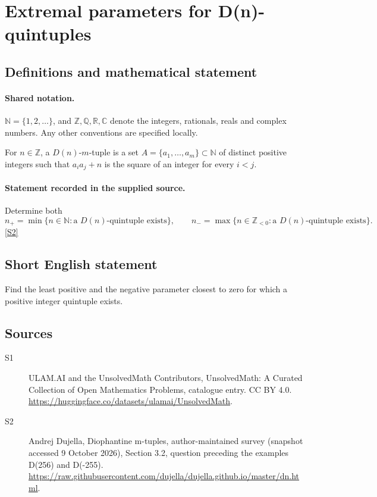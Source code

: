 \documentclass[11pt]{article}
\newcommand{\sref}[2]{\hyperlink{source:#1:#2}{[S#2]}}
\begin{document}
\section{Extremal parameters for D(n)-quintuples}\label{statement}

\subsection{Definitions and mathematical statement}

\paragraph{Shared notation.}$\mathbb N=\{1,2,\ldots\}$, and $\mathbb Z,\mathbb Q,\mathbb R,\mathbb C$ denote the integers, rationals, reals and complex numbers. Any other conventions are specified locally.


For $n\in\mathbb Z$, a $D(n)$-$m$-tuple is a set $A=\{a_1,\ldots,a_m\}\subset\mathbb N$ of distinct positive integers such that $a_i a_j+n$ is the square of an integer for every $i<j$.
\paragraph{Statement recorded in the supplied source.}
Determine both \[ n_+=\min\{n\in\mathbb N:\text{a }D(n)\text{-quintuple exists}\},\qquad n_-=\max\{n\in\mathbb Z_{<0}:\text{a }D(n)\text{-quintuple exists}\}.\] \sref{statement}{2}
\subsection{Short English statement}
Find the least positive and the negative parameter closest to zero for which a positive integer quintuple exists.
\subsection{Sources}
\begin{description}
\item[\hypertarget{source:statement:1}{S1}] ULAM.AI and the UnsolvedMath Contributors, UnsolvedMath: A Curated Collection of Open Mathematics Problems, catalogue entry. CC BY 4.0. \url{https://huggingface.co/datasets/ulamai/UnsolvedMath}.
\item[\hypertarget{source:statement:2}{S2}] Andrej Dujella, Diophantine m-tuples, author-maintained survey (snapshot accessed 9 October 2026), Section 3.2, question preceding the examples D(256) and D(-255). \url{https://raw.githubusercontent.com/dujella/dujella.github.io/master/dn.html}.
\end{description}
\label{end:statement}
\end{document}
